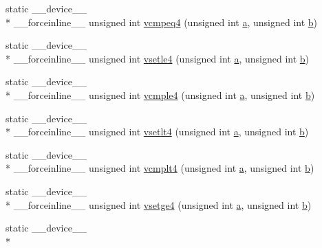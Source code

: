 \begin{DoxyCompactItemize}
\item 
static \-\_\-\-\_\-device\-\_\-\-\_\- \\*
\-\_\-\-\_\-forceinline\-\_\-\-\_\- unsigned int \hyperlink{namespacecv_1_1gpu_1_1device_a7b70cee04874e2df14bcfed96663b123}{vcmpeq4} (unsigned int \hyperlink{legacy_8hpp_a1031d0e0a97a340abfe0a6ab9e831045}{a}, unsigned int \hyperlink{legacy_8hpp_ac04272e8ca865b8fba18d36edae9fd2a}{b})
\item 
static \-\_\-\-\_\-device\-\_\-\-\_\- \\*
\-\_\-\-\_\-forceinline\-\_\-\-\_\- unsigned int \hyperlink{namespacecv_1_1gpu_1_1device_a5a125e4cc5d50bfbc4a8184829f92d2c}{vsetle4} (unsigned int \hyperlink{legacy_8hpp_a1031d0e0a97a340abfe0a6ab9e831045}{a}, unsigned int \hyperlink{legacy_8hpp_ac04272e8ca865b8fba18d36edae9fd2a}{b})
\item 
static \-\_\-\-\_\-device\-\_\-\-\_\- \\*
\-\_\-\-\_\-forceinline\-\_\-\-\_\- unsigned int \hyperlink{namespacecv_1_1gpu_1_1device_a60af091f075141791a74c7b25f72de36}{vcmple4} (unsigned int \hyperlink{legacy_8hpp_a1031d0e0a97a340abfe0a6ab9e831045}{a}, unsigned int \hyperlink{legacy_8hpp_ac04272e8ca865b8fba18d36edae9fd2a}{b})
\item 
static \-\_\-\-\_\-device\-\_\-\-\_\- \\*
\-\_\-\-\_\-forceinline\-\_\-\-\_\- unsigned int \hyperlink{namespacecv_1_1gpu_1_1device_aa06ea50b29d68c03ef217c28aa16d946}{vsetlt4} (unsigned int \hyperlink{legacy_8hpp_a1031d0e0a97a340abfe0a6ab9e831045}{a}, unsigned int \hyperlink{legacy_8hpp_ac04272e8ca865b8fba18d36edae9fd2a}{b})
\item 
static \-\_\-\-\_\-device\-\_\-\-\_\- \\*
\-\_\-\-\_\-forceinline\-\_\-\-\_\- unsigned int \hyperlink{namespacecv_1_1gpu_1_1device_a4f3869b9e9d7597399cececc41e092dd}{vcmplt4} (unsigned int \hyperlink{legacy_8hpp_a1031d0e0a97a340abfe0a6ab9e831045}{a}, unsigned int \hyperlink{legacy_8hpp_ac04272e8ca865b8fba18d36edae9fd2a}{b})
\item 
static \-\_\-\-\_\-device\-\_\-\-\_\- \\*
\-\_\-\-\_\-forceinline\-\_\-\-\_\- unsigned int \hyperlink{namespacecv_1_1gpu_1_1device_a4f13190039d62667919e4f39c269cf97}{vsetge4} (unsigned int \hyperlink{legacy_8hpp_a1031d0e0a97a340abfe0a6ab9e831045}{a}, unsigned int \hyperlink{legacy_8hpp_ac04272e8ca865b8fba18d36edae9fd2a}{b})
\item 
static \-\_\-\-\_\-device\-\_\-\-\_\- \\*

\end{DoxyCompactItemize}
